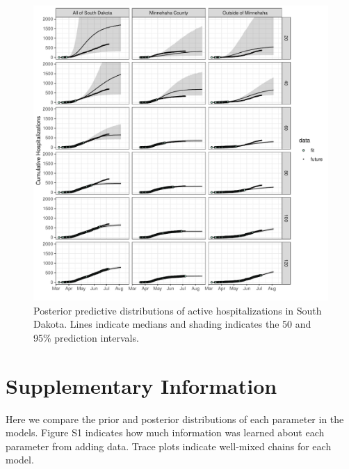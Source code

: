 \documentclass[
]{article}
\begin{document}
\begin{figure}
\centering
\includegraphics{manuscript_files/figure-latex/unnamed-chunk-4-1.pdf}
\caption{\label{fig:unnamed-chunk-4}Posterior predictive distributions of active hospitalizations in South Dakota. Lines indicate medians and shading indicates the 50 and 95\% prediction intervals.\label{active_daily_group:plot}}
\end{figure}

\hypertarget{supplementary-information}{%
\section{Supplementary Information}\label{supplementary-information}}

Here we compare the prior and posterior distributions of each parameter in the models. Figure S1 indicates how much information was learned about each parameter from adding data. Trace plots indicate well-mixed chains for each model.
\end{document}
